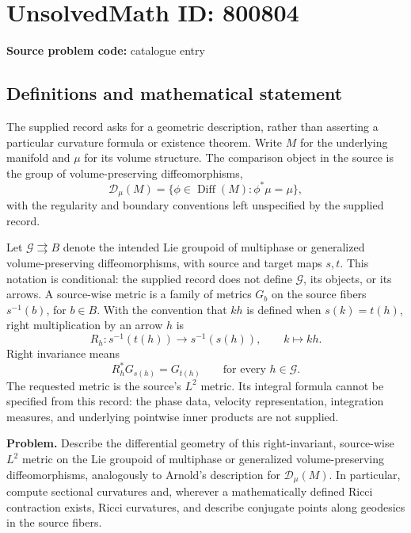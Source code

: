 \documentclass[11pt]{article}
\begin{document}
\section*{UnsolvedMath ID: 800804}
\textbf{Source problem code:} catalogue entry
\subsection{Definitions and mathematical statement}
The supplied record asks for a geometric description, rather than asserting a particular curvature formula or existence theorem. Write \(M\) for the underlying manifold and \(\mu\) for its volume structure. The comparison object in the source is the group of volume-preserving diffeomorphisms,
\[
\mathscr{D}_{\mu}(M)=\{\phi\in\operatorname{Diff}(M):\phi^*\mu=\mu\},
\]
with the regularity and boundary conventions left unspecified by the supplied record.

Let \(\mathcal G\rightrightarrows B\) denote the intended Lie groupoid of multiphase or generalized volume-preserving diffeomorphisms, with source and target maps \(s,t\). This notation is conditional: the supplied record does not define \(\mathcal G\), its objects, or its arrows. A source-wise metric is a family of metrics \(G_b\) on the source fibers \(s^{-1}(b)\), for \(b\in B\). With the convention that \(kh\) is defined when \(s(k)=t(h)\), right multiplication by an arrow \(h\) is
\[
R_h:s^{-1}(t(h))\longrightarrow s^{-1}(s(h)),\qquad k\longmapsto kh.
\]
Right invariance means
\[
R_h^*G_{s(h)}=G_{t(h)}\qquad\text{for every }h\in\mathcal G.
\]
The requested metric is the source's \(L^2\) metric. Its integral formula cannot be specified from this record: the phase data, velocity representation, integration measures, and underlying pointwise inner products are not supplied.

\textbf{Problem.} Describe the differential geometry of this right-invariant, source-wise \(L^2\) metric on the Lie groupoid of multiphase or generalized volume-preserving diffeomorphisms, analogously to Arnold's description for \(\mathscr{D}_{\mu}(M)\). In particular, compute sectional curvatures and, wherever a mathematically defined Ricci contraction exists, Ricci curvatures, and describe conjugate points along geodesics in the source fibers.
\end{document}
